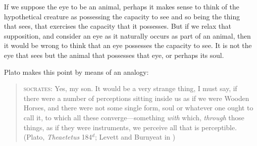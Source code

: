 If we suppose the eye to be an animal, perhaps it makes sense to think of the hypothetical creature as possessing the capacity to see and so being the thing that sees, that exercises the capacity that it possesses. But if we relax that supposition, and consider an eye as it naturally occurs as part of an animal, then it would be wrong to think that an eye possesses the capacity to see. It is not the eye that sees but the animal that possesses that eye, or perhaps its soul. 

Plato makes this point by means of an analogy: 
\begin{quote}
	\textsc{socrates}: Yes, my son. It would be a very strange thing, I must say, if there were a number of perceptions sitting inside us as if we were Wooden Horses, and there were not some single form, soul or whatever one ought to call it, to which all these converge---something \emph{with} which, \emph{through} those things, as if they were instruments, we perceive all that is perceptible. (Plato, \emph{Theaetetus} 184\( ^{d} \); Levett and Burnyeat in \citealt[204]{Cooper:1997fk})
\end{quote}
